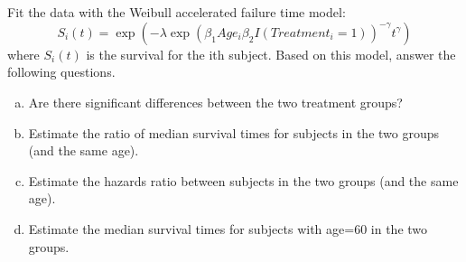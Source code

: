\documentclass{elegantbook}
\begin{document}

\setcounter{chapter}{9}
\chapter{}

\begin{exercise*}[1]
    Fit the data with the Weibull accelerated failure time model:
    \[S_i(t)=\exp\left(-\lambda\exp(\beta_1Age_i\beta_2 I(Treatment_i=1))^{-\gamma}t^\gamma\right)\]
    where $S_i(t)$ is the survival for the ith subject. Based on this model, answer the following questions.
    \begin{enumerate}[(a)]
        \item Are there significant differences between the two treatment groups? 
        \item Estimate the ratio of median survival times for subjects in the two groups (and the same age).
        \item Estimate the hazards ratio between subjects in the two groups (and the same age). 
        \item Estimate the median survival times for subjects with age=60 in the two groups.
    \end{enumerate}
\end{exercise*}
\end{document}
